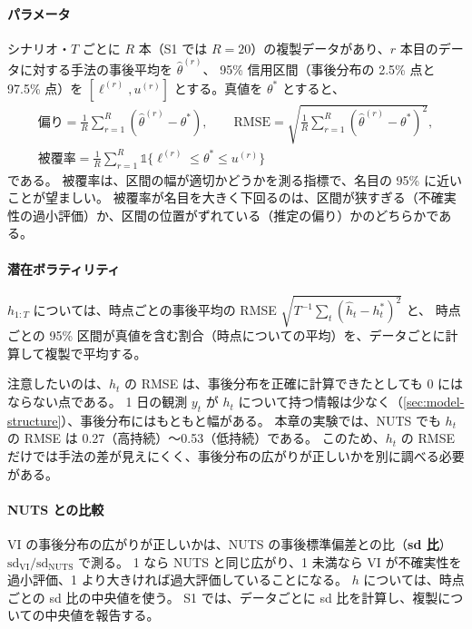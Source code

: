 \paragraph{パラメータ}
シナリオ・$T$ ごとに $R$ 本（S1 では $R = 20$）の複製データがあり、$r$ 本目のデータに対する手法の事後平均を $\hat\theta^{(r)}$、
95\% 信用区間（事後分布の 2.5\% 点と 97.5\% 点）を $[\ell^{(r)}, u^{(r)}]$ とする。真値を $\theta^\ast$ とすると、
\begin{equation}
  \begin{gathered}
    \text{偏り} = \frac{1}{R}\sum_{r=1}^R (\hat\theta^{(r)} - \theta^\ast), \qquad
    \mathrm{RMSE} = \sqrt{\frac{1}{R}\sum_{r=1}^R (\hat\theta^{(r)} - \theta^\ast)^2}, \\
    \text{被覆率} = \frac{1}{R}\sum_{r=1}^R \mathbb{1}\{\ell^{(r)} \le \theta^\ast \le u^{(r)}\}
  \end{gathered}
  \label{eq:syn-metrics}
\end{equation}
である。
被覆率は、区間の幅が適切かどうかを測る指標で、名目の 95\% に近いことが望ましい。
被覆率が名目を大きく下回るのは、区間が狭すぎる（不確実性の過小評価）か、区間の位置がずれている（推定の偏り）かのどちらかである。

\paragraph{潜在ボラティリティ}
$h_{1:T}$ については、時点ごとの事後平均の RMSE $\sqrt{T^{-1}\sum_t (\hat h_t - h_t^\ast)^2}$ と、
時点ごとの 95\% 区間が真値を含む割合（時点についての平均）を、データごとに計算して複製で平均する。

注意したいのは、$h_t$ の RMSE は、事後分布を正確に計算できたとしても 0 にはならない点である。
1 日の観測 $y_t$ が $h_t$ について持つ情報は少なく（\cref{sec:model-structure}）、事後分布にはもともと幅がある。
本章の実験では、NUTS でも $h_t$ の RMSE は 0.27（高持続）〜0.53（低持続）である。
このため、$h_t$ の RMSE だけでは手法の差が見えにくく、事後分布の広がりが正しいかを別に調べる必要がある。

\paragraph{NUTS との比較}
VI の事後分布の広がりが正しいかは、NUTS の事後標準偏差との比（\textbf{sd 比}）$\mathrm{sd}_{\mathrm{VI}} / \mathrm{sd}_{\mathrm{NUTS}}$ で測る。
1 なら NUTS と同じ広がり、1 未満なら VI が不確実性を過小評価、1 より大きければ過大評価していることになる。
$h$ については、時点ごとの sd 比の中央値を使う。
S1 では、データごとに sd 比を計算し、複製についての中央値を報告する。

